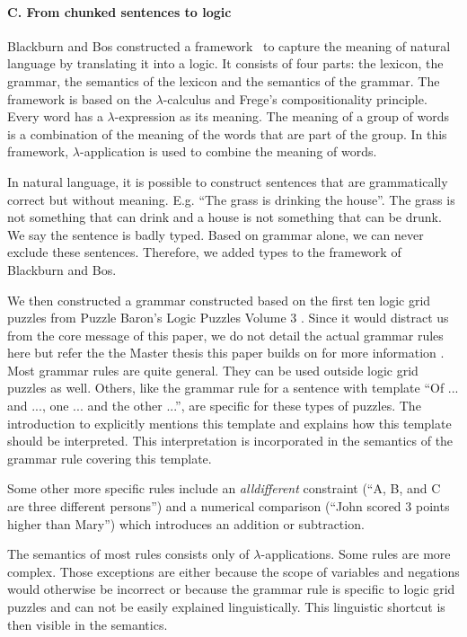 \paragraph{C. From chunked sentences to logic}

Blackburn and Bos constructed a framework~\cite{Blackburn2005,Blackburn2006} to capture the meaning of natural language by translating it into a logic. It consists of four parts: the lexicon, the grammar, the semantics of the lexicon and the semantics of the grammar. The framework is based on the $\lambda$-calculus and Frege's compositionality principle. Every word has a $\lambda$-expression as its meaning. The meaning of a group of words is a combination of the meaning of the words that are part of the group. In this framework, $\lambda$-application is used to combine the meaning of words.

In natural language, it is possible to construct sentences that are grammatically correct but without meaning. E.g. ``The grass is drinking the house''. The grass is not something that can drink and a house is not something that can be drunk. We say the sentence is badly typed. Based on grammar alone, we can never exclude these sentences. Therefore, we added types to the framework of Blackburn and Bos.

We then constructed a grammar constructed based on the first ten logic grid puzzles from Puzzle Baron's Logic Puzzles Volume 3 \cite{logigrammen}.
Since it would distract us from the core message of this paper, we do not detail the actual grammar rules here but refer the the Master thesis this paper builds on \cite{msc/Claes17} for more information . 
Most grammar rules are quite general. They can be used outside logic grid puzzles as well. Others, like the grammar rule for a sentence with template ``Of ... and ..., one ... and the other ...'', are specific for these types of puzzles. The introduction to \cite{logigrammen} explicitly mentions this template and explains how this template should be interpreted. This interpretation is incorporated in the semantics of the grammar rule covering this template.

Some other more specific rules include an \textit{alldifferent} constraint (``A, B, and C are three different persons'') and a numerical comparison (``John scored 3 points higher than Mary'') which introduces an addition or subtraction.

The semantics of most rules consists only of $\lambda$-applications. Some rules are more complex. Those exceptions are either because the scope of variables and negations would otherwise be incorrect or because the grammar rule is specific to logic grid puzzles and can not be easily explained linguistically. This linguistic shortcut is then visible in the semantics.

